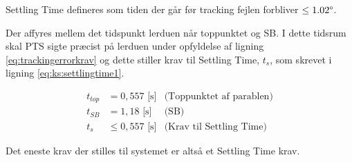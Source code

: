 Settling Time defineres som tiden der går før tracking fejlen forbliver \(\leq 1.02 \degree\).

Der affyres mellem det tidspunkt lerduen når toppunktet og SB.
I dette tidsrum skal PTS sigte præcist på lerduen under opfyldelse af ligning \ref{eq:trackingerrorkrav} og dette 
stiller krav til Settling Time, \(t_s\), som skrevet i ligning \ref{eq:ks:settlingtime1}.

\begin{align}
  t_{top} &= 0,557\text{ [s]} &\text{(Toppunktet af parablen)}
  \label{eq:ks:toppunktstid}
  \\
   t_{SB} &= 1,18\text{ [s]} &\text{(SB)}
  \label{eq:ks:toppunktstid}
  \\
  t_{s} & \leq 0,557\text{ [s]} &\text{(Krav til Settling Time)}
  \label{eq:ks:settlingtime1}
\end{align}

Det eneste krav der stilles til systemet er altså et Settling Time krav.



